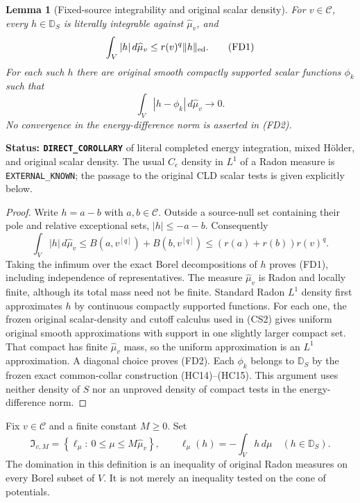 \documentclass[11pt,a4paper]{article}
\numberwithin{equation}{section}
\newtheorem{lemma}[theorem]{Lemma}
\theoremstyle{definition}
\theoremstyle{remark}
\begin{document}
\begin{lemma}[Fixed-source integrability and original scalar density]
\label{lem:r12-fixed-source-L1-density}
For $v\in\mathscr C$, every $h\in\mathbb D_S$ is literally
integrable against $\widehat\mu_v$, and
\[
 \int_V |h|\,d\widehat\mu_v
       \leq r(v)^q\|h\|_{\rm ed}.
 \tag{FD1}
\]
For each such $h$ there are original smooth compactly supported
scalar functions $\phi_k$ such that
\[
       \int_V|h-\phi_k|\,d\widehat\mu_v\longrightarrow0.
 \tag{FD2}
\]
No convergence in the energy-difference norm is asserted in
\textup{(FD2)}.
\end{lemma}

\noindent\textbf{Status: \texttt{DIRECT\_COROLLARY}} of literal
completed energy integration, mixed H\"older, and original
scalar density. The usual $C_c$ density in $L^1$ of a Radon
measure is \texttt{EXTERNAL\_KNOWN}; the passage to the original
CLD scalar tests is given explicitly below.

\begin{proof}
Write $h=a-b$ with $a,b\in\mathscr C$. Outside a source-null
set containing their pole and relative exceptional sets,
$|h|\leq-a-b$. Consequently
\[
 \int_V|h|\,d\widehat\mu_v
 \leq B(a,v^{[q]})+B(b,v^{[q]})
 \leq(r(a)+r(b))r(v)^q.
\]
Taking the infimum over the exact Borel decompositions of $h$
proves \textup{(FD1)}, including independence of representatives.
The measure $\widehat\mu_v$ is Radon and locally finite, although
its total mass need not be finite. Standard Radon $L^1$ density
first approximates $h$ by continuous compactly supported functions.
For each one, the frozen original scalar-density and cutoff
calculus used in \textup{(CS2)} gives uniform original smooth
approximations with support in one slightly larger compact set.
That compact has finite $\widehat\mu_v$ mass, so the uniform
approximation is an $L^1$ approximation. A diagonal choice proves
\textup{(FD2)}. Each $\phi_k$ belongs to $\mathbb D_S$ by the
frozen exact common-collar construction \textup{(HC14)--(HC15)}.
This argument uses neither density of $S$ nor an unproved density
of compact tests in the energy-difference norm.
\end{proof}

Fix $v\in\mathscr C$ and a finite constant $M\geq0$. Set
\[
 \mathfrak I_{v,M}
  =\left\{\ell_\mu:\ 0\leq\mu\leq M\widehat\mu_v\right\},
 \qquad
 \ell_\mu(h)=-\int_Vh\,d\mu\quad(h\in\mathbb D_S).
 \tag{FD3}
\]
The domination in this definition is an inequality of original
Radon measures on every Borel subset of $V$. It is not merely
an inequality tested on the cone of potentials.
\end{document}
